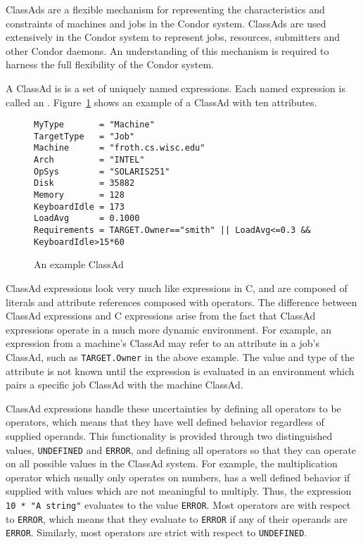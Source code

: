ClassAds are a flexible mechanism for representing the characteristics and
constraints of machines and jobs in the Condor system.  ClassAds are used
extensively in the Condor system to represent jobs, resources, submitters
and other Condor daemons.  An understanding of this mechanism is required
to harness the full flexibility of the Condor system.

A ClassAd is is a set of uniquely named expressions.  Each named expression
is called an .  Figure~\ref{ClassAd:example} shows an example 
of a ClassAd with ten attributes.

\begin{figure}[hbt]
\begin{verbatim}
MyType       = "Machine"
TargetType   = "Job"
Machine      = "froth.cs.wisc.edu"
Arch         = "INTEL"
OpSys        = "SOLARIS251"
Disk         = 35882
Memory       = 128
KeyboardIdle = 173
LoadAvg      = 0.1000
Requirements = TARGET.Owner=="smith" || LoadAvg<=0.3 && KeyboardIdle>15*60
\end{verbatim}
\caption{\label{ClassAd:example}An example ClassAd}
\end{figure}

ClassAd expressions look very much like expressions in C, and are composed
of literals and attribute references composed with operators.  The difference
between ClassAd expressions and C expressions arise from the fact that ClassAd
expressions operate in a much more dynamic environment.  For example, an
expression from a machine's ClassAd may refer to an attribute in a job's 
ClassAd, such as \verb+TARGET.Owner+ in the above example.  The value and type 
of the attribute is not known until the expression is evaluated in an 
environment which pairs a specific job ClassAd with the machine ClassAd.

ClassAd expressions handle these uncertainties by defining all operators
to be  operators, which means that they have well defined
behavior regardless of supplied operands.  This functionality is provided
through two distinguished values, \texttt{UNDEFINED} and \texttt{ERROR},
and defining all operators so that they can operate on all possible values
in the ClassAd system.  For example, the multiplication operator which usually
only operates on numbers, has a well defined behavior if supplied with values
which are not meaningful to multiply.  Thus, the expression 
\verb+10 * "A string"+ evaluates to the value \texttt{ERROR}.  Most operators
are  with respect to \texttt{ERROR}, which means that they evaluate
to \texttt{ERROR} if any of their operands are \texttt{ERROR}.  Similarly,
most operators are strict with respect to \texttt{UNDEFINED}.

